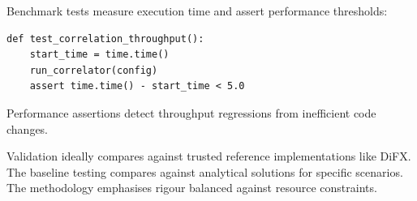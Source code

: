 Benchmark tests measure execution time and assert performance thresholds:

\begin{verbatim}
def test_correlation_throughput():
    start_time = time.time()
    run_correlator(config)
    assert time.time() - start_time < 5.0
\end{verbatim}

Performance assertions detect throughput regressions from inefficient code changes.

Validation ideally compares against trusted reference implementations like DiFX. The baseline testing compares against analytical solutions for specific scenarios. The methodology emphasises rigour balanced against resource constraints.
